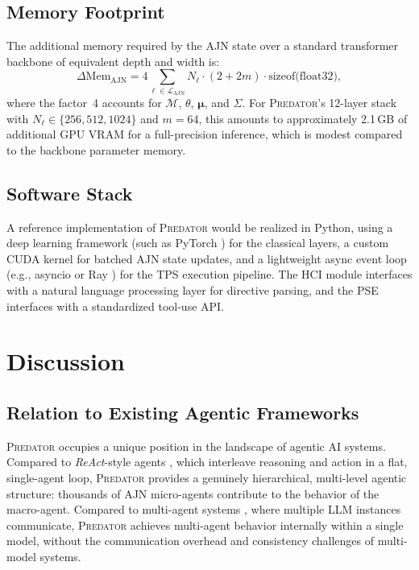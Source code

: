 \documentclass[12pt,a4paper]{article}
\newcommand{\PREDATOR}{\textsc{Predator}}
\begin{document}
\subsection{Memory Footprint}

The additional memory required by the AJN state over a standard transformer
backbone of equivalent depth and width is:
\[
  \Delta \text{Mem}_{\text{AJN}} = 4 \sum_{\ell \in \mathcal{L}_{\text{AJN}}}
    N_\ell \cdot (2 + 2m) \cdot \text{sizeof(float32)},
\]
where the factor~4 accounts for $\mathcal{M}$, $\theta$, $\boldsymbol{\mu}$,
and $\Sigma$. For \PREDATOR's 12-layer stack with $N_\ell \in \{256, 512,
1024\}$ and $m = 64$, this amounts to approximately 2.1\,GB of additional
GPU VRAM for a full-precision inference, which is modest compared to the
backbone parameter memory.

\subsection{Software Stack}

A reference implementation of \PREDATOR{} would be realized in Python,
using a deep learning framework (such as PyTorch \cite{paszke2019pytorch})
for the classical layers, a custom CUDA kernel for batched AJN state updates,
and a lightweight async event loop (e.g., asyncio or Ray \cite{moritz2018ray})
for the TPS execution pipeline. The HCI module interfaces with a natural
language processing layer for directive parsing, and the PSE interfaces with
a standardized tool-use API.

\section{Discussion}
\label{sec:discussion}

\subsection{Relation to Existing Agentic Frameworks}

\PREDATOR{} occupies a unique position in the landscape of agentic AI systems.
Compared to \textit{ReAct}-style agents \cite{yao2022react}, which interleave
reasoning and action in a flat, single-agent loop, \PREDATOR{} provides a
genuinely hierarchical, multi-level agentic structure: thousands of AJN
micro-agents contribute to the behavior of the macro-agent. Compared to
multi-agent systems \cite{park2023generative}, where multiple LLM instances
communicate, \PREDATOR{} achieves multi-agent behavior internally within a
single model, without the communication overhead and consistency challenges
of multi-model systems.
\end{document}
